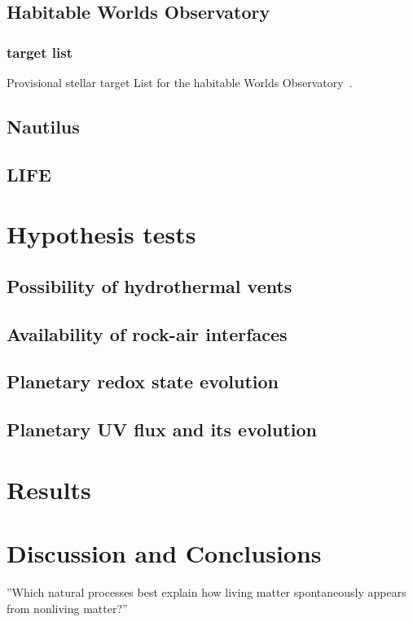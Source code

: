 \documentclass[twocolumn]{aastex631}
\begin{document}
\subsection{Habitable Worlds Observatory}
\subsubsection{target list}
Provisional stellar target List for the habitable Worlds Observatory~\citep{Mamajek2023}.

\subsection{Nautilus}
\subsection{LIFE} %

\section{Hypothesis tests}
\label{sec:hypotests}
\subsection{Possibility of hydrothermal vents}

\subsection{Availability of rock-air interfaces}

\subsection{Planetary redox state evolution}

\subsection{Planetary UV flux and its evolution}


\section{Results}
\label{sec:results}

\section{Discussion and Conclusions}
\label{sec:discussion}

''Which natural processes best explain how living matter spontaneously appears from nonliving matter?''~\citep{Malaterre2022}


\end{document}
